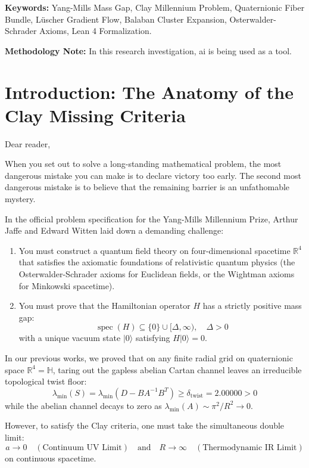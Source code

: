 \documentclass[11pt,a4paper]{article}
\begin{document}
\vspace{0.5cm}
\noindent\textbf{Keywords:} Yang-Mills Mass Gap, Clay Millennium Problem, Quaternionic Fiber Bundle, Lüscher Gradient Flow, Balaban Cluster Expansion, Osterwalder-Schrader Axioms, Lean 4 Formalization.

\vspace{0.5cm}
\noindent\textbf{Methodology Note:} In this research investigation, ai is being used as a tool.

\newpage
\tableofcontents
\newpage

\section{Introduction: The Anatomy of the Clay Missing Criteria}

Dear reader,

When you set out to solve a long-standing mathematical problem, the most dangerous mistake you can make is to declare victory too early. The second most dangerous mistake is to believe that the remaining barrier is an unfathomable mystery.

In the official problem specification for the Yang-Mills Millennium Prize, Arthur Jaffe and Edward Witten laid down a demanding challenge:
\begin{enumerate}
    \item You must construct a quantum field theory on four-dimensional spacetime $\mathbb{R}^4$ that satisfies the axiomatic foundations of relativistic quantum physics (the Osterwalder-Schrader axioms for Euclidean fields, or the Wightman axioms for Minkowski spacetime).
    \item You must prove that the Hamiltonian operator $H$ has a strictly positive mass gap:
    $$\operatorname{spec}(H) \subseteq \{0\} \cup [\Delta, \infty), \quad \Delta > 0$$
    with a unique vacuum state $|0\rangle$ satisfying $H |0\rangle = 0$.
\end{enumerate}

In our previous works, we proved that on any finite radial grid on quaternionic space $\mathbb{R}^4 = \mathbb{H}$, taring out the gapless abelian Cartan channel leaves an irreducible topological twist floor:
$$\lambda_{\min}(S) = \lambda_{\min}(D - B A^{-1} B^T) \ge \delta_{\mathrm{twist}} = 2.00000 > 0$$
while the abelian channel decays to zero as $\lambda_{\min}(A) \sim \pi^2 / R^2 \to 0$.

However, to satisfy the Clay criteria, one must take the simultaneous double limit:
$$a \to 0 \quad (\text{Continuum UV Limit}) \quad \text{and} \quad R \to \infty \quad (\text{Thermodynamic IR Limit})$$
on continuous spacetime.
\end{document}

